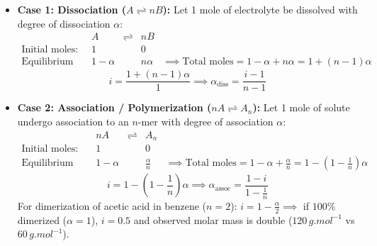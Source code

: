 \documentclass[10pt,a4paper]{article}
\begin{document}
\begin{formulabox}
\begin{itemize}
  \item \textbf{Case 1: Dissociation ($A \rightleftharpoons n B$):}
  Let 1 mole of electrolyte be dissolved with degree of dissociation $\alpha$:
  \begin{equation}
    \begin{array}{lcccc}
      & A & \rightleftharpoons & n B & \\
      \text{Initial moles:} & 1 & & 0 & \\
      \text{Equilibrium moles:} & 1 - \alpha & & n\alpha & \implies \text{Total moles} = 1 - \alpha + n\alpha = 1 + (n - 1)\alpha
    \end{array}
  \end{equation}
  \begin{equation}
    i = \frac{1 + (n - 1)\alpha}{1} \implies \alpha_{\text{diss}} = \frac{i - 1}{n - 1}
  \end{equation}
  \item \textbf{Case 2: Association / Polymerization ($n A \rightleftharpoons A_n$):}
  Let 1 mole of solute undergo association to an $n$-mer with degree of association $\alpha$:
  \begin{equation}
    \begin{array}{lcccc}
      & n A & \rightleftharpoons & A_n & \\
      \text{Initial moles:} & 1 & & 0 & \\
      \text{Equilibrium moles:} & 1 - \alpha & & \frac{\alpha}{n} & \implies \text{Total moles} = 1 - \alpha + \frac{\alpha}{n} = 1 - \left(1 - \frac{1}{n}\right)\alpha
    \end{array}
  \end{equation}
  \begin{equation}
    i = 1 - \left(1 - \frac{1}{n}\right)\alpha \implies \alpha_{\text{assoc}} = \frac{1 - i}{1 - \frac{1}{n}}
  \end{equation}
  For dimerization of acetic acid in benzene ($n = 2$): $i = 1 - \frac{\alpha}{2} \implies$ if $100\%$ dimerized ($\alpha=1$), $i = 0.5$ and observed molar mass is double ($120\,\si{g.mol^{-1}}$ vs $60\,\si{g.mol^{-1}}$).
\end{itemize}
\end{formulabox}

\end{document}
